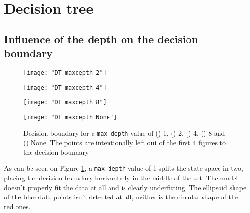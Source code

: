 \documentclass[12pt]{article}
\begin{document}
\section{Decision tree}

\subsection{Influence of the depth on the decision boundary}

\begin{figure}[htbp]
\centering
\begin{minipage}{0.3\linewidth}%
  \centering
\label{fig:1a}%
\end{minipage}%
\begin{minipage}{0.3\linewidth}%
  \centering
  \texttt{[image: "DT maxdepth 2"]}%
\label{fig:1b}%
\end{minipage}%
\begin{minipage}{0.3\linewidth}%
  \centering
  \texttt{[image: "DT maxdepth 4"]}%
\label{fig:1c}%
\end{minipage}
\newline
\centering
\begin{minipage}{0.3\linewidth}%
  \centering
  \texttt{[image: "DT maxdepth 8"]}%
\label{fig:1d}%
\end{minipage}%
\begin{minipage}{0.3\linewidth}%
  \centering
  \texttt{[image: "DT maxdepth None"]}%
\label{fig:1e}%
\end{minipage}%

\caption{ \label{fig:maxdepth} Decision boundary for a \texttt{max\_depth} value of () 1, () 2, () 4, () 8 and () None. The points are intentionally left out of the first 4 figures to the decision boundary}
\end{figure}

As can be seen on Figure \ref{fig:maxdepth}, a \texttt{max\_depth} value of 1 splits the state space in two, placing the decision boundary horizontally in the middle of the set. The model doesn't properly fit the data at all and is clearly underfitting. The ellipsoid shape of the blue data points isn't detected at all, neither is the circular shape of the red ones.
\end{document}

